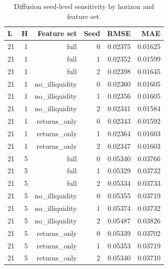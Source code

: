 \begin{table}[!htbp]
\centering
\caption{Diffusion seed-level sensitivity by horizon and feature set.}
\label{tab:diffusion-seed-sensitivity}
\begin{tabular}{lrrrrr}
\toprule
L & H & Feature set & Seed & RMSE & MAE \\
\midrule
21 & 1 & full & 0 & 0.02375 & 0.01625 \\
21 & 1 & full & 1 & 0.02352 & 0.01599 \\
21 & 1 & full & 2 & 0.02398 & 0.01645 \\
21 & 1 & no\_illiquidity & 0 & 0.02360 & 0.01605 \\
21 & 1 & no\_illiquidity & 1 & 0.02356 & 0.01605 \\
21 & 1 & no\_illiquidity & 2 & 0.02341 & 0.01584 \\
21 & 1 & returns\_only & 0 & 0.02343 & 0.01592 \\
21 & 1 & returns\_only & 1 & 0.02364 & 0.01603 \\
21 & 1 & returns\_only & 2 & 0.02347 & 0.01603 \\
21 & 5 & full & 0 & 0.05340 & 0.03766 \\
21 & 5 & full & 1 & 0.05329 & 0.03732 \\
21 & 5 & full & 2 & 0.05334 & 0.03733 \\
21 & 5 & no\_illiquidity & 0 & 0.05355 & 0.03719 \\
21 & 5 & no\_illiquidity & 1 & 0.05374 & 0.03732 \\
21 & 5 & no\_illiquidity & 2 & 0.05487 & 0.03826 \\
21 & 5 & returns\_only & 0 & 0.05339 & 0.03702 \\
21 & 5 & returns\_only & 1 & 0.05353 & 0.03719 \\
21 & 5 & returns\_only & 2 & 0.05340 & 0.03710 \\
\bottomrule
\end{tabular}
\end{table}
